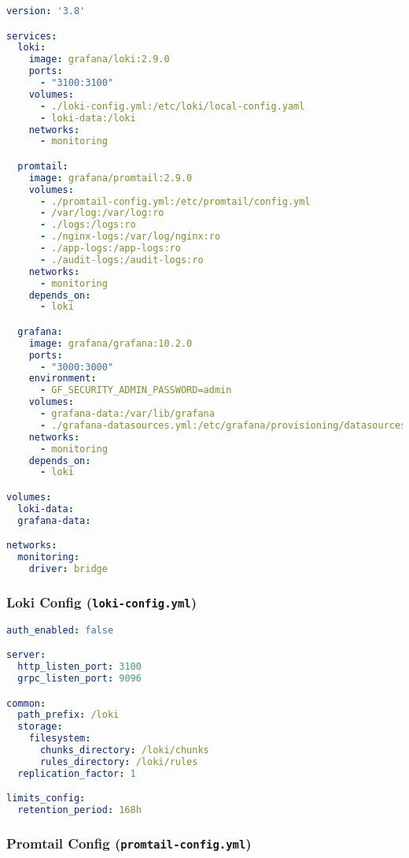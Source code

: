 \documentclass[a4paper,12pt]{article}
\begin{document}
\begin{lstlisting}[language=yaml]
version: '3.8'

services:
  loki:
    image: grafana/loki:2.9.0
    ports:
      - "3100:3100"
    volumes:
      - ./loki-config.yml:/etc/loki/local-config.yaml
      - loki-data:/loki
    networks:
      - monitoring

  promtail:
    image: grafana/promtail:2.9.0
    volumes:
      - ./promtail-config.yml:/etc/promtail/config.yml
      - /var/log:/var/log:ro
      - ./logs:/logs:ro
      - ./nginx-logs:/var/log/nginx:ro
      - ./app-logs:/app-logs:ro
      - ./audit-logs:/audit-logs:ro
    networks:
      - monitoring
    depends_on:
      - loki

  grafana:
    image: grafana/grafana:10.2.0
    ports:
      - "3000:3000"
    environment:
      - GF_SECURITY_ADMIN_PASSWORD=admin
    volumes:
      - grafana-data:/var/lib/grafana
      - ./grafana-datasources.yml:/etc/grafana/provisioning/datasources
    networks:
      - monitoring
    depends_on:
      - loki

volumes:
  loki-data:
  grafana-data:

networks:
  monitoring:
    driver: bridge
\end{lstlisting}

\subsubsection{Loki Config (\texttt{loki-config.yml})}

\begin{lstlisting}[language=yaml]
auth_enabled: false

server:
  http_listen_port: 3100
  grpc_listen_port: 9096

common:
  path_prefix: /loki
  storage:
    filesystem:
      chunks_directory: /loki/chunks
      rules_directory: /loki/rules
  replication_factor: 1

limits_config:
  retention_period: 168h
\end{lstlisting}

\subsubsection{Promtail Config (\texttt{promtail-config.yml})}
\end{document}
